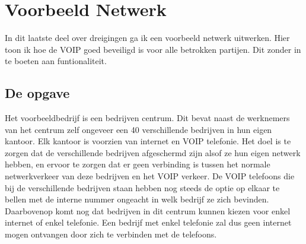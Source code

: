 \documentclass[pdftex,a4paper,12pt,twoside]{report}
\begin{document}
\section{Voorbeeld Netwerk}
In dit laatste deel over dreigingen ga ik een voorbeeld netwerk uitwerken. Hier toon ik hoe de VOIP goed beveiligd is voor alle betrokken partijen. Dit zonder in te boeten aan funtionaliteit.
\newpage
\subsection{De opgave}
Het voorbeeldbedrijf is een bedrijven centrum. Dit bevat naast de werknemers van het centrum zelf ongeveer een 40 verschillende bedrijven in hun eigen kantoor. Elk kantoor is voorzien van internet en VOIP telefonie. Het doel is te zorgen dat de verschillende bedrijven afgeschermd zijn alsof ze hun eigen netwerk hebben, en ervoor te zorgen dat er geen verbinding is tussen het normale netwerkverkeer van deze bedrijven en het VOIP verkeer. De VOIP telefoons die bij de verschillende bedrijven staan hebben nog steeds de optie op elkaar te bellen met de interne nummer ongeacht in welk bedrijf ze zich bevinden. Daarbovenop komt nog dat bedrijven in dit centrum kunnen kiezen voor enkel internet of enkel telefonie. Een bedrijf met enkel telefonie zal dus geen internet mogen ontvangen door zich te verbinden met de telefoons.
\end{document}
